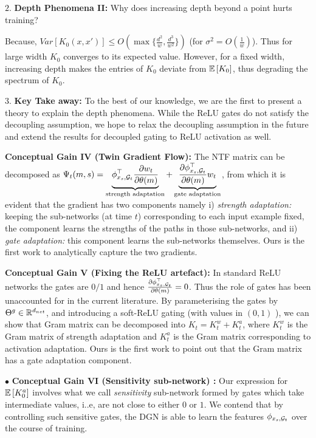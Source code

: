 $2.$ \textbf{Depth Phenomena II:} Why does increasing depth beyond a point hurts training?

Because, $Var\left[K_0(x,x')\right]\leq O(\max\{\frac{d^2}{w}, \frac{d^3}{w^2}\})$ (for $\sigma^2=O(\frac{1}w)$). Thus for large width $K_0$ converges to its expected value. However, for a fixed width, increasing depth makes the entries of $K_0$ deviate from $\mathbb{E}\left[K_0\right]$, thus degrading the spectrum of $K_0$.

$3.$ \textbf{Key Take away:}  To the best of our knowledge, we are the first to present a theory to explain the depth phenomena. While the ReLU gates do not satisfy the decoupling assumption, we hope to relax the decoupling assumption in the future and extend the results for decoupled gating to ReLU activation as well.


\textbf{Conceptual Gain IV  (Twin Gradient Flow):} The NTF matrix can be decomposed as
$
\Psi_t(m,s)=\underbrace{\phi_{x_s,\mathcal{G}_t }^\top\frac{\partial w_{t}} {\partial \theta(m)}}_{\text{strength adaptation}}+ \underbrace{\frac{\partial \phi_{x_s,\mathcal{G}_t }^\top}{\partial \theta(m)} w_{t} }_{\text{gate adaptation}}
$, from which it is evident that the gradient has two components namely i) \emph{strength adaptation:} keeping the sub-networks (at time $t$) corresponding to each input example fixed, the component learns the strengths of the paths in those sub-networks, and  ii) \emph{gate adaptation:} this component learns the sub-networks themselves.  Ours is the first work to analytically capture the two gradients.

\textbf{Conceptual Gain V  (Fixing the ReLU artefact):} In standard ReLU networks the gates are $0/1$ and hence $\frac{\partial \phi_{x_s,\mathcal{G}_t }^\top}{\partial \theta(m)}=0$. Thus the role of gates has been unaccounted for in the current literature.
By parameterising the gates by ${\Theta}^g\in\mathbb{R}^{d_{net}}$, and introducing a soft-ReLU gating (with values in $(0,1)$ ), we can show that Gram matrix can be decomposed into $K_t=K^w_t+K^a_t$, where $K^w_t$ is the Gram matrix of strength adaptation and $K^a_t$ is the Gram matrix corresponding to activation adaptation. Ours is the first work to point out that the Gram matrix has a gate adaptation component.


$\bullet$ \textbf{Conceptual Gain VI (Sensitivity sub-network) :} Our expression for $\mathbb{E}\left[K_0^a\right]$ involves what we call \emph{sensitivity} sub-network formed by gates which take intermediate values, i..e, are not close to either $0$ or $1$. We contend that by controlling such sensitive gates, the DGN is able to learn the features $\phi_{x_s,\mathcal{G}_t}$ over the course of training.

